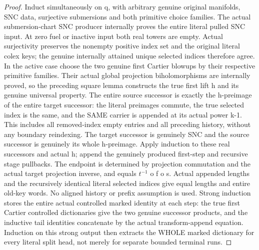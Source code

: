 \begin{proof}
Induct simultaneously on q, with arbitrary genuine original manifolds,
SNC data, surjective submersions and both primitive choice families. The
actual submersion-chart SNC producer internally proves the entire literal
pulled SNC input. At zero fuel or inactive input both real towers are empty.
Actual surjectivity preserves the nonempty positive index set and the
original literal colex keys; the genuine internally attained unique selected
indices therefore agree. In the active case choose the two genuine first
Cartier blowups by their respective primitive families. Their actual global
projection biholomorphisms are internally proved, so the preceding square
lemma constructs the true first lift h and its genuine universal property.
The entire source successor is exactly the h-preimage of the entire target
successor: the literal preimages commute, the true selected index is the
same, and the SAME carrier is appended at its actual power k-1. This includes
all removed-index empty entries and all preceding history, without any
boundary reindexing. The target successor is genuinely SNC and the source
successor is genuinely its whole h-preimage. Apply induction to these real
successors and actual h; append the genuinely produced first-step and
recursive stage pullbacks. The endpoint is determined by projection
commutation and the actual target projection inverse, and equals $t^{-1}$
o f o s. Actual appended lengths and the recursively identical literal
selected indices give equal lengths and entire old-key words. No aligned
history or prefix assumption is used. Strong induction stores the entire
actual controlled marked identity at each step: the true first Cartier
controlled dictionaries give the two genuine successor products, and the
inductive tail identities concatenate by the actual transform-append
equation. Induction on this strong output then extracts the WHOLE marked
dictionary for every literal split head, not merely for separate bounded
terminal runs.
\end{proof}

